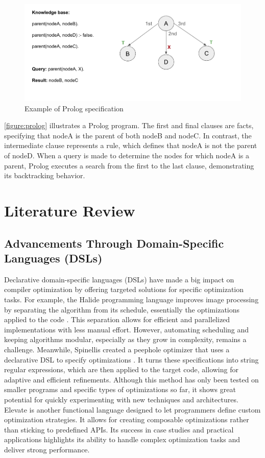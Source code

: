 \begin{figure}[h]
    \includegraphics[width=1\textwidth]{Packages/Prolog.png}
    \caption{Example of Prolog specification}
    \label{figure:prolog}
\end{figure}

\autoref{figure:prolog}  illustrates a Prolog program. The first and final clauses are facts, specifying that nodeA is the parent of both nodeB and nodeC. In contrast, the intermediate clause represents a rule, which defines that nodeA is not the parent of nodeD. When a query is made to determine the nodes for which nodeA is a parent, Prolog executes a search from the first to the last clause, demonstrating its backtracking behavior.

\section{Literature Review}

\subsection{Advancements Through Domain-Specific Languages (DSLs)}
Declarative domain-specific languages (DSLs) have made a big impact on compiler optimization by offering targeted solutions for specific optimization tasks. For example, the Halide programming language improves image processing by separating the algorithm from its schedule, essentially the optimizations applied to the code \cite{Jonathan2018}. This separation allows for efficient and parallelized implementations with less manual effort. However, automating scheduling and keeping algorithms modular, especially as they grow in complexity, remains a challenge. Meanwhile, Spinellis created a peephole optimizer that uses a declarative DSL to specify optimizations \cite{Spinellis1999}. It turns these specifications into string regular expressions, which are then applied to the target code, allowing for adaptive and efficient refinements. Although this method has only been tested on smaller programs and specific types of optimizations so far, it shows great potential for quickly experimenting with new techniques and architectures. Elevate \cite{Hagedorn2020} is another functional language designed to let programmers define custom optimization strategies. It allows for creating composable optimizations rather than sticking to predefined APIs. Its success in case studies and practical applications highlights its ability to handle complex optimization tasks and deliver strong performance.

